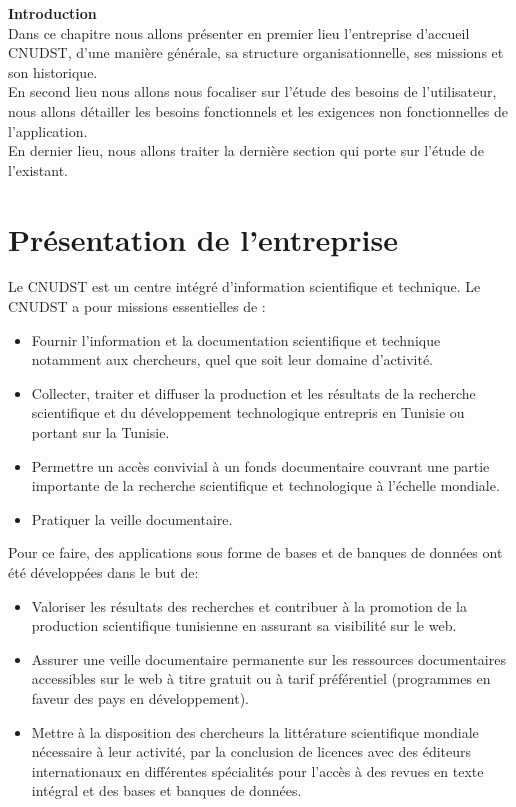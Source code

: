 


\textbf{Introduction} \\
Dans ce chapitre nous allons présenter en premier lieu l'entreprise d'accueil CNUDST, d’une   manière   générale, sa structure organisationnelle, ses missions et son historique.\\ En second lieu nous allons nous focaliser sur l'étude des besoins de l'utilisateur, nous allons détailler les besoins fonctionnels et les exigences non fonctionnelles de l'application.\\ En dernier lieu, nous allons traiter la dernière section qui porte sur l'étude de l'existant.
\section{Présentation de l’entreprise}
Le CNUDST est un centre intégré d’information scientifique et technique. Le CNUDST a pour missions essentielles de :
\begin{itemize}
	\item Fournir l’information et la documentation scientifique et technique notamment aux chercheurs, quel que soit leur domaine d’activité.
	\item Collecter, traiter et diffuser la production et les résultats de la recherche scientifique et du développement technologique entrepris en Tunisie ou portant sur la Tunisie.
	\item Permettre un accès convivial à un fonds documentaire couvrant une partie importante de la recherche scientifique et technologique à l’échelle mondiale.
	\item Pratiquer la veille documentaire.
\end{itemize}
Pour ce faire, des applications sous forme de bases et de banques de données ont été développées dans le but de:
\begin{itemize}
	\item Valoriser les résultats des recherches et contribuer à la promotion de la production scientifique tunisienne en assurant sa visibilité sur le web.
	\item Assurer une veille documentaire permanente sur les ressources documentaires accessibles sur le web à titre gratuit ou à tarif préférentiel (programmes en faveur des pays en développement).
	\item Mettre à la disposition des chercheurs la littérature scientifique mondiale nécessaire à leur activité, par la conclusion de licences avec des éditeurs internationaux en différentes spécialités pour l’accès à des revues en texte intégral et des bases et banques de données.
\end{itemize}
